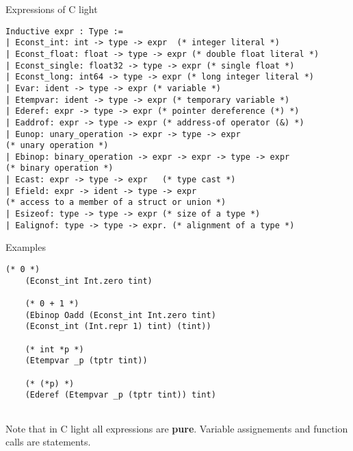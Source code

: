 \documentclass{beamer}
\begin{document}
\begin{frame}[fragile]{Expressions of C light}
  \begin{lstlisting}[language=Coq]
Inductive expr : Type :=
| Econst_int: int -> type -> expr  (* integer literal *)    
| Econst_float: float -> type -> expr (* double float literal *)
| Econst_single: float32 -> type -> expr (* single float *)
| Econst_long: int64 -> type -> expr (* long integer literal *)
| Evar: ident -> type -> expr (* variable *)
| Etempvar: ident -> type -> expr (* temporary variable *)
| Ederef: expr -> type -> expr (* pointer dereference (*) *)
| Eaddrof: expr -> type -> expr (* address-of operator (&) *)
| Eunop: unary_operation -> expr -> type -> expr
(* unary operation *)
| Ebinop: binary_operation -> expr -> expr -> type -> expr
(* binary operation *)
| Ecast: expr -> type -> expr   (* type cast *)
| Efield: expr -> ident -> type -> expr
(* access to a member of a struct or union *)
| Esizeof: type -> type -> expr (* size of a type *)
| Ealignof: type -> type -> expr. (* alignment of a type *)
\end{lstlisting}


\end{frame}


    

\begin{frame}[fragile]{Examples}

  \begin{lstlisting}[language=Coq]
    (* 0 *)
    (Econst_int Int.zero tint) 

    (* 0 + 1 *)
    (Ebinop Oadd (Econst_int Int.zero tint)
    (Econst_int (Int.repr 1) tint) (tint))

    (* int *p *)
    (Etempvar _p (tptr tint)) 
    
    (* (*p) *)
    (Ederef (Etempvar _p (tptr tint)) tint)


  \end{lstlisting}
  


\end{frame}


\begin{frame}

Note that in C light all expressions are {\bf pure}. Variable assignements and function calls are statements.
    
\end{frame}
\end{document}
